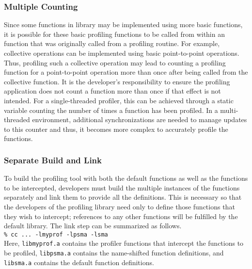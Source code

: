 \subsubsection{Multiple Counting}
\label{sec:pshmem_multiple_count}
Since some functions in \openshmem library may be implemented
using more basic \openshmem functions, it is possible for these basic
profiling functions to be called from within an \openshmem function
that was originally called from a profiling routine. For example,
\openshmem collective operations can be implemented using basic
point-to-point operations. Thus, profiling such a collective
operation may lead to counting a profiling function for a
point-to-point operation more than once after being called from the
collective function. It is the developer's responsibility to ensure
the profiling application does not count a function more than once if
that effect is not intended. For a single-threaded profiler, this
can be achieved through a static variable counting the number of
times a function has been profiled. In a multi-threaded environment,
additional synchronizations are needed to manage updates to this
counter and thus, it becomes more complex to accurately profile the
\openshmem functions.

\subsubsection{Separate Build and Link}
\label{sec:pshmem_separate_build_link}
To build the profiling tool with both the default \openshmem
functions as well as the \openshmem functions to be intercepted,
developers must build the multiple instances of the \openshmem
functions separately and link them to provide all the definitions.
This is necessary so that the developers of the profiling library
need only to define those \openshmem functions that they wish
to intercept; references to any other functions will be fulfilled
by the default \openshmem library. The link step can be summarized
as follows. \\

\noindent\texttt{\% cc ... -lmyprof -lpsma -lsma} \\

Here, \texttt{libmyprof.a} contains the profiler functions that
intercept the \openshmem functions to be profiled,
\texttt{libpsma.a} contains the name-shifted \openshmem function
definitions, and \texttt{libsma.a} contains the default \openshmem
function definitions.

